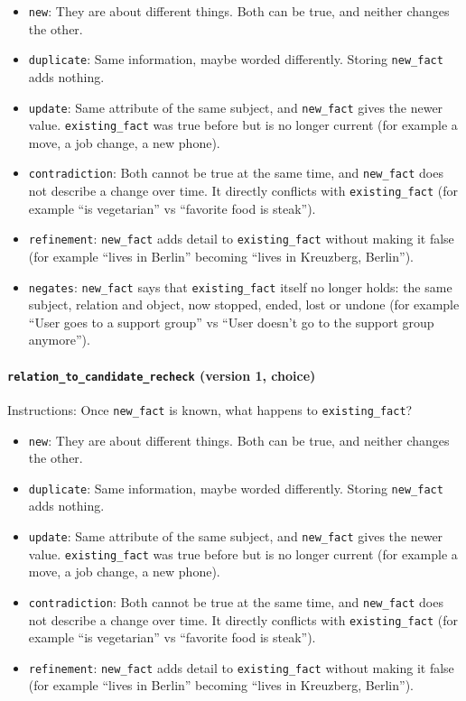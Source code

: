 \documentclass[11pt]{article}
\begin{document}
\begin{itemize}
\item \texttt{new}: They are about different things. Both can be true, and neither changes the other.
\item \texttt{duplicate}: Same information, maybe worded differently. Storing \texttt{new\_\allowbreak{}fact} adds nothing.
\item \texttt{update}: Same attribute of the same subject, and \texttt{new\_\allowbreak{}fact} gives the newer value. \texttt{existing\_\allowbreak{}fact} was true before but is no longer current (for example a move, a job change, a new phone).
\item \texttt{contradiction}: Both cannot be true at the same time, and \texttt{new\_\allowbreak{}fact} does not describe a change over time. It directly conflicts with \texttt{existing\_\allowbreak{}fact} (for example ``is vegetarian'' vs ``favorite food is steak'').
\item \texttt{refinement}: \texttt{new\_\allowbreak{}fact} adds detail to \texttt{existing\_\allowbreak{}fact} without making it false (for example ``lives in Berlin'' becoming ``lives in Kreuzberg, Berlin'').
\item \texttt{negates}: \texttt{new\_\allowbreak{}fact} says that \texttt{existing\_\allowbreak{}fact} itself no longer holds: the same subject, relation and object, now stopped, ended, lost or undone (for example ``User goes to a support group'' vs ``User doesn't go to the support group anymore'').
\end{itemize}
\paragraph{\texttt{relation\_\allowbreak{}to\_\allowbreak{}candidate\_\allowbreak{}recheck} (version 1, choice)}
Instructions: Once \texttt{new\_\allowbreak{}fact} is known, what happens to \texttt{existing\_\allowbreak{}fact}?

\begin{itemize}
\item \texttt{new}: They are about different things. Both can be true, and neither changes the other.
\item \texttt{duplicate}: Same information, maybe worded differently. Storing \texttt{new\_\allowbreak{}fact} adds nothing.
\item \texttt{update}: Same attribute of the same subject, and \texttt{new\_\allowbreak{}fact} gives the newer value. \texttt{existing\_\allowbreak{}fact} was true before but is no longer current (for example a move, a job change, a new phone).
\item \texttt{contradiction}: Both cannot be true at the same time, and \texttt{new\_\allowbreak{}fact} does not describe a change over time. It directly conflicts with \texttt{existing\_\allowbreak{}fact} (for example ``is vegetarian'' vs ``favorite food is steak'').
\item \texttt{refinement}: \texttt{new\_\allowbreak{}fact} adds detail to \texttt{existing\_\allowbreak{}fact} without making it false (for example ``lives in Berlin'' becoming ``lives in Kreuzberg, Berlin'').
\end{itemize}
\end{document}
